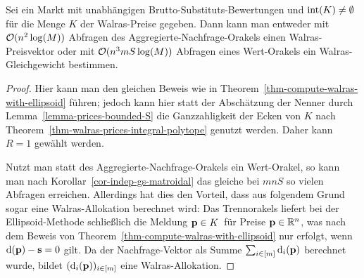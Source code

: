 \begin{theorem}
	Sei ein Markt mit unabhängigen Brutto-Substituts-Bewertungen und $\operatorname{int}(K)\neq \emptyset$ für die Menge $K$ der Walras-Preise gegeben.
	Dann kann man entweder mit $\mathcal{O}(n^2\log(M))$ Abfragen des Aggregierte-Nachfrage-Orakels einen Walras-Preisvektor oder mit $\mathcal{O}(n^3 m S\log(M))$ Abfragen eines Wert-Orakels ein Walras-Gleichgewicht bestimmen.
\end{theorem}
\begin{proof}
	Hier kann man den gleichen Beweis wie in Theorem~\ref{thm-compute-walras-with-ellipsoid} führen; jedoch kann hier statt der Abschätzung der Nenner durch Lemma~\ref{lemma-prices-bounded-S} die Ganzzahligkeit der Ecken von $K$ nach Theorem~\ref{thm-walras-prices-integral-polytope} genutzt werden.
	Daher kann $R=1$ gewählt werden.
	
	Nutzt man statt des Aggregierte-Nachfrage-Orakels ein Wert-Orakel, so kann man nach Korollar~\ref{cor-indep-gs-matroidal} das gleiche bei $mnS$ so vielen Abfragen erreichen.
	Allerdings hat dies den Vorteil, dass aus folgendem Grund sogar eine Walras-Allokation berechnet wird:
	Das Trennorakels liefert bei der Ellipsoid-Methode schließlich die Meldung \glqq$\mathbf{p}\in K$\grqq\ für Preise $\mathbf{p}\in\mathbb{R}^n$, was nach dem Beweis von Theorem~\ref{thm-compute-walras-with-ellipsoid} nur erfolgt, wenn $\operatorname{d}(\mathbf{p}) - \mathbf{s} = 0$ gilt.
	Da der Nachfrage-Vektor als Summe $\sum_{i\in\left[ m \right]} \operatorname{d}_i(\mathbf{p})$ berechnet wurde, bildet $(\operatorname{d}_i(\mathbf{p}))_{i\in\left[ m \right]}$ eine Walras-Allokation.
\end{proof}